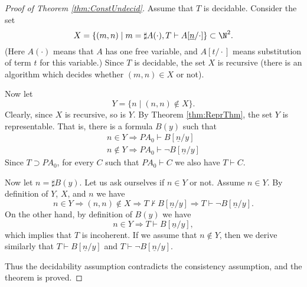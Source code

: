 
\begin{proof}[Proof of Theorem \ref{thm:ConstUndecid}]
Assume that $T$ is decidable.
Consider the set
\[
X = \{(m,n) \mid m = \sharp A(\cdot), T \vdash A[\underline{n}/\cdot]\} \subset \N^2.
\]
(Here $A(\cdot)$ means that $A$ has one free variable, and $A[t/\cdot]$ means substitution of term $t$ for this variable.)
Since $T$ is decidable, the set $X$ is recursive (there is an algorithm which decides whether $(m,n) \in X$ or not).

Now let
\[
Y = \{n \mid (n,n) \notin X\}.
\]
Clearly, since $X$ is recursive, so is $Y$.
By Theorem \ref{thm:ReprThm}, the set $Y$ is representable.
That is, there is a formula $B(y)$ such that
\begin{gather*}
n \in Y \Rightarrow PA_0 \vdash B[\underline{n}/y]\\
n \notin Y \Rightarrow PA_0 \vdash \neg B[\underline{n}/y]
\end{gather*}
Since $T \supset PA_0$, for every $C$ such that $PA_0 \vdash C$ we also have $T \vdash C$.

Now let $n = \sharp B(y)$.
Let us ask ourselves if $n \in Y$ or not. Assume $n \in Y$.
By definition of $Y$, $X$, and $n$ we have
\[
n \in Y \Rightarrow (n,n) \notin X \Rightarrow T \not\vdash B[\underline{n}/y] \Rightarrow T \vdash \neg B[\underline{n}/y].
\]
On the other hand, by definition of $B(y)$ we have
\[
n \in Y \Rightarrow T \vdash B[\underline{n}/y],
\]
which implies that $T$ is incoherent.
If we assume that $n \notin Y$, then we derive similarly that $T \vdash B[\underline{n}/y]$ and $T \vdash \neg B[\underline{n}/y]$.

Thus the decidability assumption contradicts the consistency assumption, and the theorem is proved.
\end{proof}

